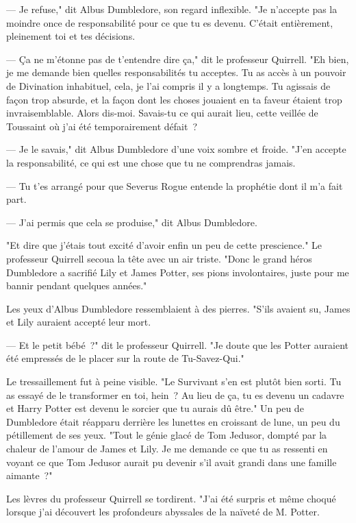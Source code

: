--- Je refuse," dit Albus Dumbledore, son regard inflexible. "Je n'accepte pas la moindre once de responsabilité pour ce que tu es devenu. C'était entièrement, pleinement toi et tes décisions.

--- Ça ne m'étonne pas de t'entendre dire ça," dit le professeur Quirrell. "Eh bien, je me demande bien quelles responsabilités tu acceptes. Tu as accès à un pouvoir de Divination inhabituel, cela, je l'ai compris il y a longtemps. Tu agissais de façon trop absurde, et la façon dont les choses jouaient en ta faveur étaient trop invraisemblable. Alors dis-moi. Savais-tu ce qui aurait lieu, cette veillée de Toussaint où j'ai été temporairement défait~?

--- Je le savais," dit Albus Dumbledore d'une voix sombre et froide. "J'en accepte la responsabilité, ce qui est une chose que tu ne comprendras jamais.

--- Tu t'es arrangé pour que Severus Rogue entende la prophétie dont il m'a fait part.

--- J'ai permis que cela se produise," dit Albus Dumbledore.

"Et dire que j'étais tout excité d'avoir enfin un peu de cette prescience." Le professeur Quirrell secoua la tête avec un air triste. "Donc le grand héros Dumbledore a sacrifié Lily et James Potter, ses pions involontaires, juste pour me bannir pendant quelques années."

Les yeux d'Albus Dumbledore ressemblaient à des pierres. "S'ils avaient su, James et Lily auraient accepté leur mort.

--- Et le petit bébé~?" dit le professeur Quirrell. "Je doute que les Potter auraient été empressés de le placer sur la route de Tu-Savez-Qui."

Le tressaillement fut à peine visible. "Le Survivant s'en est plutôt bien sorti. Tu as essayé de le transformer en toi, hein~? Au lieu de ça, tu es devenu un cadavre et Harry Potter est devenu le sorcier que tu aurais dû être." Un peu de Dumbledore était réapparu derrière les lunettes en croissant de lune, un peu du pétillement de ses yeux. "Tout le génie glacé de Tom Jedusor, dompté par la chaleur de l'amour de James et Lily. Je me demande ce que tu as ressenti en voyant ce que Tom Jedusor aurait pu devenir s'il avait grandi dans une famille aimante~?"

Les lèvres du professeur Quirrell se tordirent. "J'ai été surpris et même choqué lorsque j'ai découvert les profondeurs abyssales de la naïveté de M. Potter.


